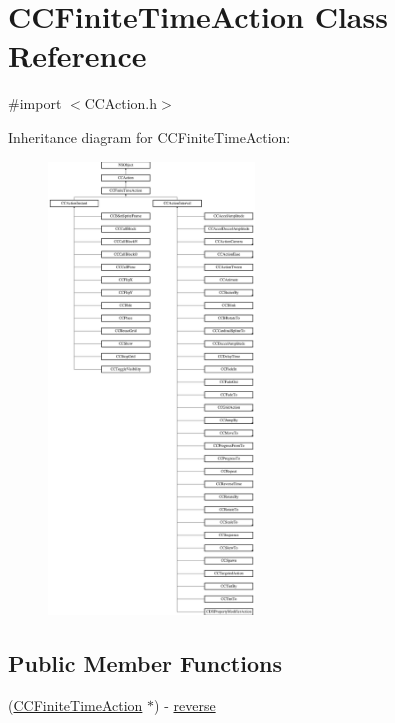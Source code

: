 \hypertarget{interface_c_c_finite_time_action}{\section{C\-C\-Finite\-Time\-Action Class Reference}
\label{interface_c_c_finite_time_action}
}


{\ttfamily \#import $<$C\-C\-Action.\-h$>$}

Inheritance diagram for C\-C\-Finite\-Time\-Action\-:\begin{figure}[H]
\begin{center}
\leavevmode
\includegraphics[height=12.000000cm]{interface_c_c_finite_time_action}
\end{center}
\end{figure}
\subsection*{Public Member Functions}
\begin{DoxyCompactItemize}
\item 
(\hyperlink{interface_c_c_finite_time_action}{C\-C\-Finite\-Time\-Action} $\ast$) -\/ \hyperlink{interface_c_c_finite_time_action_a16c1b5753dbf16a0267a069c45b3b550}{reverse}
\end{DoxyCompactItemize}
